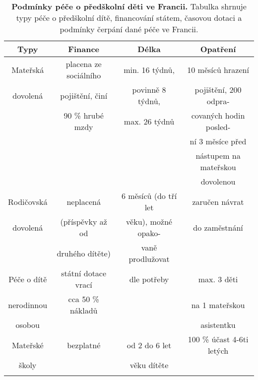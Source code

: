 		\begin{spacing}{1.0}
		\begin{table}[ht]
			\small
			\begin{center}
			\begin{tabular}{|c|c|c|c|}
				\hline
				\rowcolor{grey}		
				\textbf{Typy}	&	\textbf{Finance} & 	\textbf{Délka} 	&	\textbf{Opatření} 	\\
				\hline
				\hline
				\rowcolor{grey!10}
				Mateřská	&  placena ze sociálního &  min. 16 týdnů, 	 & 10 měsíců hrazení 		\\ \rowcolor{grey!10}
				dovolená 	& 	 pojištění, činí  	 & 	povinně 8 týdnů, & pojištění, 200 odpra- 	\\ \rowcolor{grey!10}
				 			& 	90 \% hrubé mzdy 	 &  max. 26 týdnů 	 & covaných hodin posled- 	\\ \rowcolor{grey!10}
				 			&						 & 					 & ní 3 měsíce před 		\\ \rowcolor{grey!10}
				 			&						 &					 & nástupem na mateřskou 	\\ \rowcolor{grey!10}
				 			&						 & 					 & dovolenou 				\\ \rowcolor{grey!10}
				\hline
				Rodičovská	& neplacená & 6 měsíců (do tří let 		& 	zaručen návrat 	\\ \rowcolor{grey!10}
				dovolená & (příspěvky až od & věku), možné opako-  	&  do zaměstnání	\\ \rowcolor{grey!10}
						 & druhého dítěte)  & vaně prodlužovat						&	\\ \rowcolor{grey!10}
				 \hline
				Péče o dítě	&	státní dotace vrací	&	dle potřeby	& max. 3 děti \\ \rowcolor{grey!10}
				nerodinnou 	&	cca 50 \% nákladů 	&	& na 1 mateřskou 	\\ \rowcolor{grey!10}
				osobou 		& 						&	& asistentku		\\ \rowcolor{grey!10}
				\hline
				Mateřské 	&	bezplatné	& od 2 do 6 let	& 100 \% účast 4-6ti letých \\ \rowcolor{grey!10}
				školy 		& 	 			& věku dítěte	& 						\\ \rowcolor{grey!10}
				\hline
			\end{tabular}
			\end{center}
			\label{tab:peceFR}
			\caption{
				\textbf{Podmínky péče o předškolní děti ve Francii.}
				Tabulka shrnuje typy péče o předškolní dítě, financování státem, časovou dotaci a podmínky čerpání dané péče ve Francii.
							}
		\end{table}
		\end{spacing}

